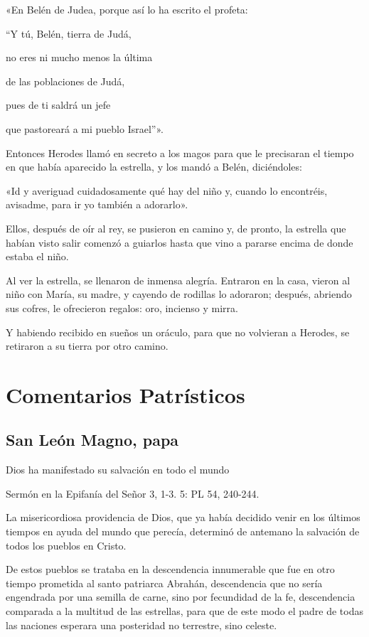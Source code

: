 «En Belén de Judea, porque así lo ha escrito el profeta:

``Y tú, Belén, tierra de Judá,

no eres ni mucho menos la última

de las poblaciones de Judá,

pues de ti saldrá un jefe

que pastoreará a mi pueblo Israel''».

Entonces Herodes llamó en secreto a los magos para que le precisaran el
tiempo en que había aparecido la estrella, y los mandó a Belén,
diciéndoles:

«Id y averiguad cuidadosamente qué hay del niño y, cuando lo encontréis,
avisadme, para ir yo también a adorarlo».

Ellos, después de oír al rey, se pusieron en camino y, de pronto, la
estrella que habían visto salir comenzó a guiarlos hasta que vino a
pararse encima de donde estaba el niño.

Al ver la estrella, se llenaron de inmensa alegría. Entraron en la casa,
vieron al niño con María, su madre, y cayendo de rodillas lo adoraron;
después, abriendo sus cofres, le ofrecieron regalos: oro, incienso y
mirra.

Y habiendo recibido en sueños un oráculo, para que no volvieran a
Herodes, se retiraron a su tierra por otro
camino.

\section{Comentarios Patrísticos}

\subsection{San León Magno, papa}

Dios ha manifestado su salvación en todo el mundo

Sermón en la Epifanía del Señor 3, 1-3. 5: PL 54, 240-244.

La misericordiosa providencia de Dios, que ya había decidido venir en los últimos tiempos en ayuda del mundo que perecía, determinó de antemano la salvación de todos los pueblos en Cristo.

De estos pueblos se trataba en la descendencia innumerable que fue en otro tiempo prometida al santo patriarca Abrahán, descendencia que no sería engendrada por una semilla de carne, sino por fecundidad de la fe, descendencia comparada a la multitud de las estrellas, para que de este modo el padre de todas las naciones esperara una posteridad no terrestre, sino celeste.

